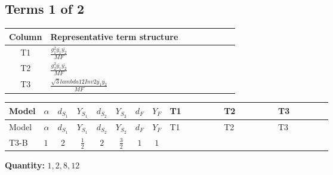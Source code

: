 \documentclass[8pt]{article}
\begin{document}
\begin{landscape}
\subsection*{Terms 1 of 2}
\begin{center}
\begin{tabular}{@{}c >{\raggedright\arraybackslash}p{0.82\linewidth}@{}}
\toprule
Column & Representative term structure \\
\midrule
T1 & \(\displaystyle \frac{g_{1}^{2} \overline{y_{1}} \overline{y_{2}}}{MF}\) \\
\midrule
T2 & \(\displaystyle \frac{g_{2}^{2} \overline{y_{1}} \overline{y_{2}}}{MF}\) \\
\midrule
T3 & \(\displaystyle \frac{\sqrt{3} lambda12Inv2 \overline{y_{1}} \overline{y_{2}}}{MF}\) \\
\midrule
\bottomrule
\end{tabular}
\end{center}
\smallskip
\tiny
\begin{longtable}{@{}llcccccc >{\raggedright\arraybackslash}p{0.21\linewidth} >{\raggedright\arraybackslash}p{0.21\linewidth} >{\raggedright\arraybackslash}p{0.21\linewidth}@{}}
\toprule
Model & $\alpha$ & $d_{S_1}$ & $Y_{S_1}$ & $d_{S_2}$ & $Y_{S_2}$ & $d_F$ & $Y_F$ & T1 & T2 & T3 \\
\midrule
\endfirsthead
\toprule
Model & $\alpha$ & $d_{S_1}$ & $Y_{S_1}$ & $d_{S_2}$ & $Y_{S_2}$ & $d_F$ & $Y_F$ & T1 & T2 & T3 \\
\midrule
\endhead
T3-B & $1$ & $2$ & $\frac{1}{2}$ & $2$ & $\frac{3}{2}$ & $1$ & $1$ & \scriptsize\adjustbox{max width=\linewidth}{$\begin{gathered} - \frac{3 g_{1}^{2} \overline{y_{1}} \overline{y_{2}}}{4 MF}\end{gathered}$} & \scriptsize\adjustbox{max width=\linewidth}{$\begin{gathered} - \frac{3 g_{2}^{2} \overline{y_{1}} \overline{y_{2}}}{8 MF}\end{gathered}$} & \scriptsize\adjustbox{max width=\linewidth}{$\begin{gathered} - \frac{\sqrt{3} lambda12Inv2 \overline{y_{1}} \overline{y_{2}}}{6 MF}\end{gathered}$} \\
\midrule
\bottomrule
\end{longtable}
\clearpage
\noindent\textbf{Quantity: }$\mathrm{1,2,8,12}$\par\smallskip

\end{landscape}
\end{document}
